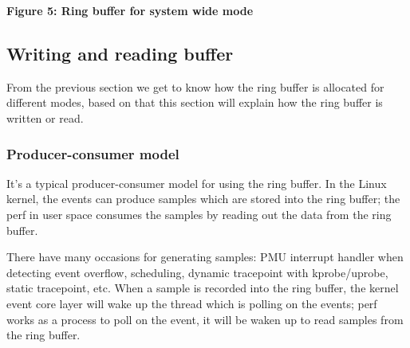 \documentclass[11pt]{diazessay} %
\begin{document}
\begin{center}
\par
\textbf{Figure 5: Ring buffer for system wide mode}
\end{center}

\subsection*{Writing and reading buffer}

From the previous section we get to know how the ring buffer is allocated for different modes, based on that this section will explain how the ring buffer is written or read.

\subsubsection*{Producer-consumer model}

It's a typical producer-consumer model for using the ring buffer.  In the Linux kernel, the events can produce samples which are stored into the ring buffer; the perf in user space consumes the samples by reading out the data from the ring buffer.

There have many occasions for generating samples: PMU interrupt handler when detecting event overflow, scheduling, dynamic tracepoint with kprobe/uprobe, static tracepoint, etc.  When a sample is recorded into the ring buffer, the kernel event core layer will wake up the thread which is polling on the events; perf works as a process to poll on the event, it will be waken up to read samples from the ring buffer.
\end{document}
